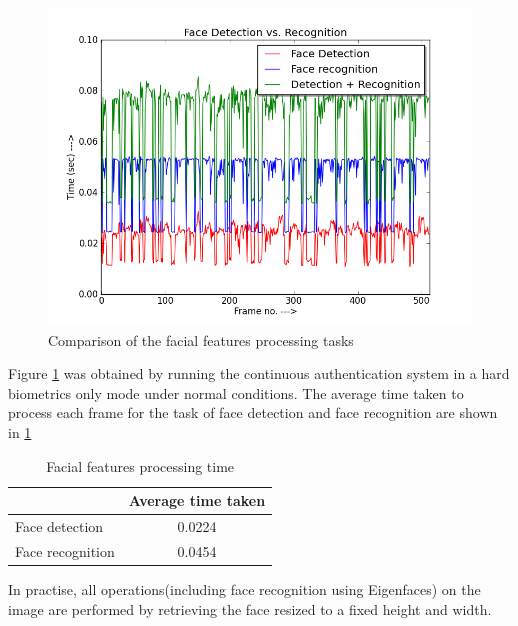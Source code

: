 \documentclass[%
        submission,
        notitlepage,
        narroweqnarray,
        inline,
        ]{ieee}
\begin{document}
\begin{figure}[h!]
	\centering
	\includegraphics[scale=0.40]{img/fd_fr_fdfr.png}
	\caption{Comparison of the facial features processing tasks}
	\label{fig:fdfr}
\end{figure}
Figure \ref{fig:fdfr} was obtained by running the continuous authentication system in a hard biometrics only mode under normal conditions. The average time taken to process each frame for the task of face detection and face recognition are shown in \ref{tab:fdr}

\begin{table}[htp]
	\centering
	\caption{Facial features processing time}
	\begin{tabular}{||l|c||} \hline \hline
			    &  Average time taken \\ \hline
	Face detection      &  0.0224             \\ \hline
	Face recognition    &  0.0454             \\ \hline \hline
	\end{tabular}
	\label{tab:fdr}
\end{table}
In practise, all operations(including face recognition using Eigenfaces) on the image are performed by retrieving the face resized to a fixed height and width.
\end{document}
